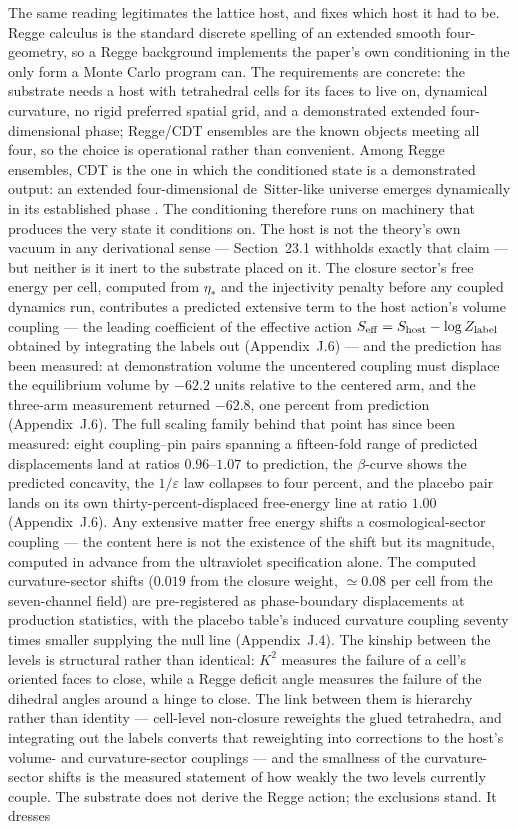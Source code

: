 \documentclass[11pt]{article}
\begin{document}
The same reading legitimates the lattice host, and fixes which host it had to be. Regge calculus is the standard discrete spelling of an extended smooth four-geometry, so a Regge background implements the paper's own conditioning in the only form a Monte Carlo program can. The requirements are concrete: the substrate needs a host with tetrahedral cells for its faces to live on, dynamical curvature, no rigid preferred spatial grid, and a demonstrated extended four-dimensional phase; Regge/CDT ensembles are the known objects meeting all four, so the choice is operational rather than convenient. Among Regge ensembles, CDT is the one in which the conditioned state is a demonstrated output: an extended four-dimensional de~Sitter-like universe emerges dynamically in its established phase \citep{AmbjornJurkiewiczLoll2004,AmbjornGJL2012}. The conditioning therefore runs on machinery that produces the very state it conditions on. The host is not the theory's own vacuum in any derivational sense --- Section~23.1 withholds exactly that claim --- but neither is it inert to the substrate placed on it. The closure sector's free energy per cell, computed from $\eta_*$ and the injectivity penalty before any coupled dynamics run, contributes a predicted extensive term to the host action's volume coupling --- the leading coefficient of the effective action $S_{\rm eff}=S_{\rm host}-\log Z_{\rm label}$ obtained by integrating the labels out (Appendix~J.6) --- and the prediction has been measured: at demonstration volume the uncentered coupling must displace the equilibrium volume by $-62.2$ units relative to the centered arm, and the three-arm measurement returned $-62.8$, one percent from prediction (Appendix~J.6). The full scaling family behind that point has since been measured: eight coupling--pin pairs spanning a fifteen-fold range of predicted displacements land at ratios $0.96$--$1.07$ to prediction, the $\beta$-curve shows the predicted concavity, the $1/\varepsilon$ law collapses to four percent, and the placebo pair lands on its own thirty-percent-displaced free-energy line at ratio $1.00$ (Appendix~J.6). Any extensive matter free energy shifts a cosmological-sector coupling --- the content here is not the existence of the shift but its magnitude, computed in advance from the ultraviolet specification alone. The computed curvature-sector shifts ($0.019$ from the closure weight, $\simeq0.08$ per cell from the seven-channel field) are pre-registered as phase-boundary displacements at production statistics, with the placebo table's induced curvature coupling seventy times smaller supplying the null line (Appendix~J.4). The kinship between the levels is structural rather than identical: $K^2$ measures the failure of a cell's oriented faces to close, while a Regge deficit angle measures the failure of the dihedral angles around a hinge to close. The link between them is hierarchy rather than identity --- cell-level non-closure reweights the glued tetrahedra, and integrating out the labels converts that reweighting into corrections to the host's volume- and curvature-sector couplings --- and the smallness of the curvature-sector shifts is the measured statement of how weakly the two levels currently couple. The substrate does not derive the Regge action; the exclusions stand. It dresses 
\end{document}
